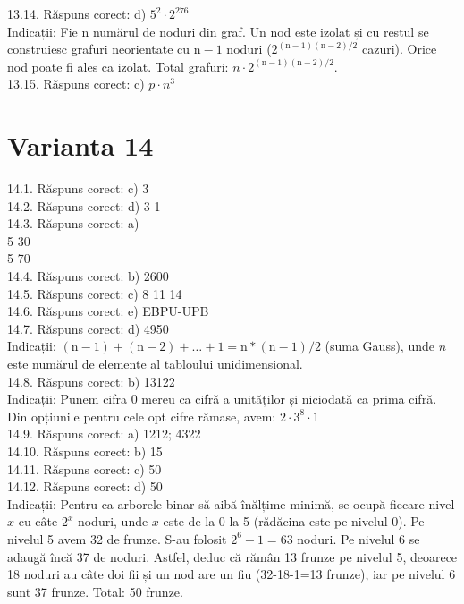 13.14. Răspuns corect: d) $5^{2} \cdot 2^{276}$\\
Indicații: Fie $\mathrm{n}$ numărul de noduri din graf. Un nod este izolat și cu restul se construiesc grafuri neorientate cu $\mathrm{n}-1$ noduri ($2^{(\mathrm{n}-1)(\mathrm{n}-2)/2}$ cazuri). Orice nod poate fi ales ca izolat. Total grafuri: $n \cdot 2^{(\mathrm{n}-1)(\mathrm{n}-2)/2}$.\\

13.15. Răspuns corect: c) $p \cdot n^{3}$\\

\section*{Varianta 14}

14.1. Răspuns corect: c) 3\\

14.2. Răspuns corect: d) 3 1\\

14.3. Răspuns corect: a) \\5 30\\5 70\\

14.4. Răspuns corect: b) 2600\\

14.5. Răspuns corect: c) 8 11 14\\

14.6. Răspuns corect: e) EBPU-UPB\\

14.7. Răspuns corect: d) 4950\\
Indicații: $(\mathrm{n}-1)+(\mathrm{n}-2)+\ldots+1=\mathrm{n}*(\mathrm{n}-1) / 2$ (suma Gauss), unde $n$ este numărul de elemente al tabloului unidimensional.\\

14.8. Răspuns corect: b) 13122\\
Indicații: Punem cifra 0 mereu ca cifră a unităților și niciodată ca prima cifră. Din opțiunile pentru cele opt cifre rămase, avem: $2 \cdot 3^{8} \cdot 1$\\

14.9. Răspuns corect: a) 1212; 4322\\

14.10. Răspuns corect: b) 15\\

14.11. Răspuns corect: c) 50\\

14.12. Răspuns corect: d) 50\\
Indicații: Pentru ca arborele binar să aibă înălțime minimă, se ocupă fiecare nivel $x$ cu câte $2^{x}$ noduri, unde $x$ este de la 0 la 5 (rădăcina este pe nivelul 0). Pe nivelul 5 avem 32 de frunze. S-au folosit $2^{6}-1=63$ noduri. Pe nivelul 6 se adaugă încă 37 de noduri. Astfel, deduc că rămân 13 frunze pe nivelul 5, deoarece 18 noduri au câte doi fii și un nod are un fiu (32-18-1=13 frunze), iar pe nivelul 6 sunt 37 frunze. Total: 50 frunze.\\

